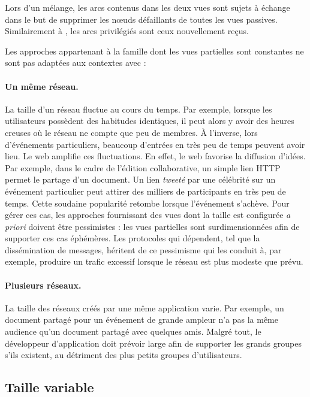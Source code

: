 \noindent Lors d'un mélange, les arcs contenus dans les deux vues sont sujets à
échange dans le but de supprimer les nœuds défaillants de toutes les vues
passives. Similairement à \CYCLON, les arcs privilégiés sont ceux nouvellement
reçus.


Les approches appartenant à la famille dont les vues partielles
sont constantes ne sont pas adaptées aux contextes avec :

\paragraph{Un même réseau.} La taille d'un réseau fluctue au cours du temps. Par
exemple, lorsque les utilisateurs possèdent des habitudes identiques, il peut
alors y avoir des heures creuses où le réseau ne compte que peu de membres. À
l'inverse, lors d'événements particuliers, beaucoup d'entrées en très peu de
temps peuvent avoir lieu. Le web amplifie ces fluctuations. En effet, le web
favorise la diffusion d'idées. Par exemple, dans le cadre de l'édition
collaborative, un simple lien HTTP permet le partage d'un document. Un lien
\emph{tweeté} par une célébrité sur un événement particulier peut attirer des
milliers de participants en très peu de temps. Cette soudaine popularité retombe
lorsque l'événement s'achève.  Pour gérer ces cas, les approches fournissant des
vues dont la taille est configurée \emph{a priori} doivent être pessimistes :
les vues partielles sont surdimensionnées afin de supporter ces cas
éphémères. Les protocoles qui dépendent, tel que la dissémination de messages,
héritent de ce pessimisme qui les conduit à, par exemple, produire un trafic
excessif lorsque le réseau est plus modeste que prévu.


\paragraph{Plusieurs réseaux.} La taille des réseaux créés par une même
application varie. Par exemple, un document partagé pour un événement de grande
ampleur n'a pas la même audience qu'un document partagé avec quelques
amis. Malgré tout, le développeur d'application doit prévoir large afin de
supporter les grands groupes s'ils existent, au détriment des plus petits
groupes d'utilisateurs.





\subsection{Taille variable}
\label{net:subsec:variable}

